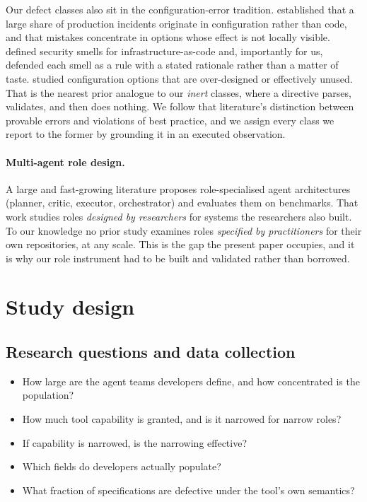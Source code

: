 \documentclass[smallextended,natbib]{svjour3}
\begin{document}
Our defect classes also sit in the configuration-error tradition. \citet{yin2011empirical} established
that a large share of production incidents originate in configuration rather than code, and that
mistakes concentrate in options whose effect is not locally visible. \citet{rahman2019seven} defined
security smells for infrastructure-as-code and, importantly for us, defended each smell as a rule
with a stated rationale rather than a matter of taste. \citet{xu2015knobs} studied configuration
options that are over-designed or effectively unused. That is the nearest prior analogue to our
\emph{inert} classes, where a directive parses, validates, and then does nothing. We follow that
literature's distinction between provable errors and violations of best practice, and we assign every
class we report to the former by grounding it in an executed observation.

\paragraph{Multi-agent role design.}
A large and fast-growing literature proposes role-specialised agent architectures (planner, critic,
executor, orchestrator) and evaluates them on benchmarks. That work studies roles \emph{designed by
researchers} for systems the researchers also built. To our knowledge no prior study examines roles
\emph{specified by practitioners} for their own repositories, at any scale. This is the gap the
present paper occupies, and it is why our role instrument had to be built and validated rather than
borrowed.

\section{Study design}
\label{sec:design}

\subsection{Research questions and data collection}
\begin{itemize}\itemsep2pt
  \item[\textbf{RQ1}] How large are the agent teams developers define, and how concentrated is the
        population?
  \item[\textbf{RQ2}] How much tool capability is granted, and is it narrowed for narrow roles?
  \item[\textbf{RQ3}] If capability is narrowed, is the narrowing effective?
  \item[\textbf{RQ4}] Which fields do developers actually populate?
  \item[\textbf{RQ5}] What fraction of specifications are defective under the tool's own semantics?
\end{itemize}
\end{document}
